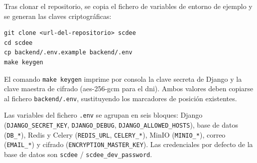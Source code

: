 Tras clonar el repositorio, se copia el fichero de variables de entorno
de ejemplo y se generan las claves criptográficas:

\begin{verbatim}
git clone <url-del-repositorio> scdee
cd scdee
cp backend/.env.example backend/.env
make keygen
\end{verbatim}

El comando \texttt{make keygen} imprime por consola la clave secreta de
Django y la clave maestra de cifrado (\acs{aes}-256-\acs{gcm} para el
\acs{dni}). Ambos valores deben copiarse al fichero \texttt{backend/.env},
sustituyendo los marcadores de posición existentes.

Las variables del fichero \texttt{.env} se agrupan en seis bloques:
Django (\texttt{DJANGO\_SECRET\_KEY}, \texttt{DJANGO\_DEBUG},
\texttt{DJANGO\_ALLOWED\_HOSTS}), base de datos (\texttt{DB\_*}), Redis
y Celery (\texttt{REDIS\_URL}, \texttt{CELERY\_*}), MinIO
(\texttt{MINIO\_*}), correo (\texttt{EMAIL\_*}) y cifrado
(\texttt{ENCRYPTION\_MASTER\_KEY}). Las credenciales por defecto de la
base de datos son \texttt{scdee} / \texttt{scdee\_dev\_password}.
